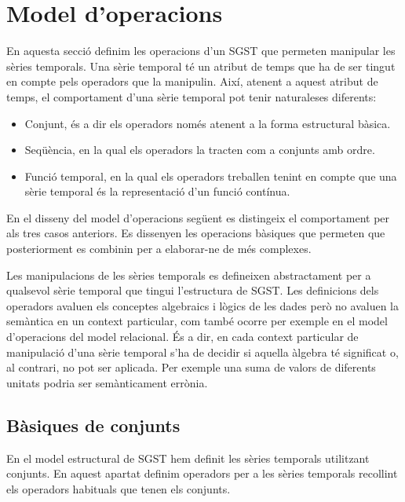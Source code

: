 \section{Model d'operacions}
\label{sec:model:sgst-operacions}

En aquesta secció definim les operacions d'un \gls{SGST} que permeten
manipular les sèries temporals.  Una sèrie temporal té un atribut de
temps que ha de ser tingut en compte pels operadors que la manipulin.
Així, atenent a aquest atribut de temps, el comportament d'una sèrie
temporal pot tenir naturaleses diferents:
\begin{itemize}
\item Conjunt, és a dir els operadors només atenent a la forma
  estructural bàsica.
\item Seqüència, en la qual els operadors la tracten com a conjunts
  amb ordre.
\item Funció temporal, en la qual els operadors treballen tenint en
  compte que una sèrie temporal és la representació d'un funció
  contínua.
\end{itemize}



En el disseny del model d'operacions següent es distingeix el
comportament per als tres casos anteriors.  Es dissenyen les
operacions bàsiques que permeten que posteriorment es combinin per
a elaborar-ne de més complexes.


Les manipulacions de les sèries temporals es defineixen abstractament
per a qualsevol sèrie temporal que tingui l'estructura de \gls{SGST}.
Les definicions dels operadors avaluen els
conceptes algebraics i lògics de les dades però no avaluen la
semàntica en un context particular, com també ocorre per exemple en el
model d'operacions del model relacional. És a dir, en cada context
particular de manipulació d'una sèrie temporal s'ha de decidir si
aquella àlgebra té significat o, al contrari, no pot ser aplicada. Per
exemple una suma de valors de diferents unitats podria ser
semànticament errònia.





\subsection{Bàsiques de conjunts}

En el model estructural de \gls{SGST} hem definit les sèries temporals
utilitzant conjunts. En aquest apartat definim operadors per a les
sèries temporals recollint els operadors habituals que tenen els
conjunts.

